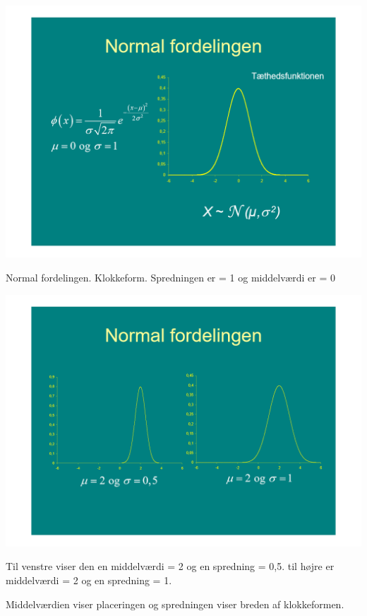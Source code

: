 \documentclass[12pt, letterpaper]{article}
\begin{document}
\begin{center}
\includegraphics[width=\textwidth]{billeder/billede21}
\end{center}
Normal fordelingen. Klokkeform. Spredningen er = 1 og middelværdi er = 0

\begin{center}
\includegraphics[width=\textwidth]{billeder/billede22}
\end{center}
Til venstre viser den en middelværdi = 2 og en spredning = 0,5. til højre er middelværdi = 2 og en spredning = 1. 

Middelværdien viser placeringen og spredningen viser breden af klokkeformen. 
\end{document}
